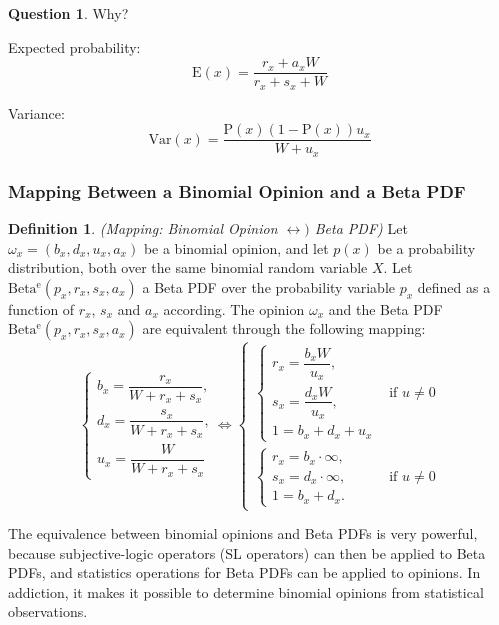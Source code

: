 \documentclass[a4paper,12pt]{article}
\theoremstyle{definition}
\newtheorem{question}{Question}[section]
\newtheorem{definition}{Definition}[section]
\numberwithin{equation}{section}
\begin{document}
\begin{question}
	Why?
\end{question} 

Expected probability:
\begin{equation}
	\mathrm{E}(x) = \frac{r_x + a_x W}{r_x + s_x + W}
\end{equation}

Variance:
\begin{equation}
	\mathrm{Var}(x) = \frac{\mathrm{P}(x)(1 - \mathrm{P}(x))u_x}{W + u_x}
\end{equation}

\subsubsection{Mapping Between a Binomial Opinion and a Beta PDF}

\begin{definition}
	\emph{(Mapping: Binomial Opinion $\leftrightarrow)$ Beta PDF)} Let $\omega_x = (b_x, d_x, u_x, a_x)$ be a binomial opinion, and let $p(x)$ be a probability distribution, both over the same binomial random variable $X$. Let $\mathrm{Beta^e}(p_x, r_x, s_x, a_x)$ a Beta PDF over the probability variable $p_x$ defined as a function of $r_x$, $s_x$ and
$a_x$ according. The opinion $\omega_x$ and the Beta PDF $\mathrm{Beta^e}(p_x, r_x, s_x, a_x)$ are
 equivalent through the following mapping:
	\begin{equation}
		\begin{cases}
			b_x = \dfrac{r_x}{W + r_x + s_x}\text{,}\\
			d_x = \dfrac{s_x}{W + r_x + s_x}\text{,}\\
			u_x = \dfrac{W}{W + r_x + s_x}
		\end{cases} \Leftrightarrow
		\begin{cases}
			\begin{cases}
				r_x = \dfrac{b_x W}{u_x}\text{,}\\
				s_x = \dfrac{d_x W}{u_x}\text{,}\\
				1 = b_x + d_x + u_x
			\end{cases} & \text{if } u \neq 0 \\
			\begin{cases}
				r_x = b_x \cdot \infty \text{,}\\
				s_x = d_x \cdot \infty \text{,}\\
				1 = b_x + d_x \text{.}
			\end{cases} & \text{if } u \neq 0
		\end{cases}
	\end{equation}
\end{definition}

The equivalence between binomial opinions and Beta PDFs is very powerful, because subjective-logic operators (SL operators) can then be applied to Beta PDFs, and statistics operations for Beta PDFs can be applied to opinions. In addiction, it makes it possible to determine binomial opinions from statistical observations.
\end{document}
